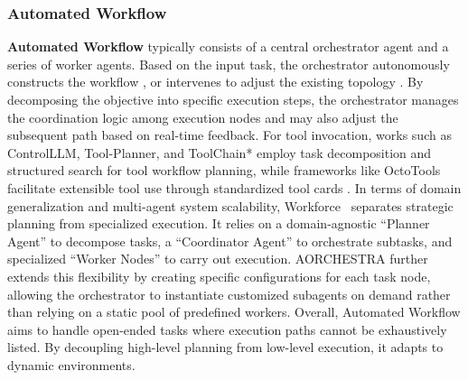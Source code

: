 \documentclass{llmxive}
\begin{document}
\subsubsection{Automated Workflow}
\label{sec:automated_workflow}
\textbf{Automated Workflow} typically consists of a central orchestrator agent and a series of worker agents. Based on the input task, the orchestrator autonomously constructs the workflow \cite{HuggingGPT, Mindsearch, Cognitive_Kernel_Pro}, or intervenes to adjust the existing topology \cite{PLAN_AND_ACT, Agent_e,Webpilot}. By decomposing the objective into specific execution steps, the orchestrator manages the coordination logic among execution nodes and may also adjust the subsequent path based on real-time feedback. For tool invocation, works such as ControlLLM, Tool-Planner, and ToolChain* employ task decomposition and structured search for tool workflow planning, while frameworks like OctoTools facilitate extensible tool use through standardized tool cards \cite{ControlLLM,ToolPlanner,ToolChainStar,OctoTools}. In terms of domain generalization and multi-agent system scalability, Workforce~\cite{OWL} separates strategic planning from specialized execution. It relies on a domain-agnostic ``Planner Agent'' to decompose tasks, a ``Coordinator Agent'' to orchestrate subtasks, and specialized ``Worker Nodes'' to carry out execution. AORCHESTRA \cite{AORCHESTRA} further extends this flexibility by creating specific configurations for each task node, allowing the orchestrator to instantiate customized subagents on demand rather than relying on a static pool of predefined workers. Overall, Automated Workflow aims to handle open-ended tasks where execution paths cannot be exhaustively listed. By decoupling high-level planning from low-level execution, it adapts to dynamic environments.
\end{document}
